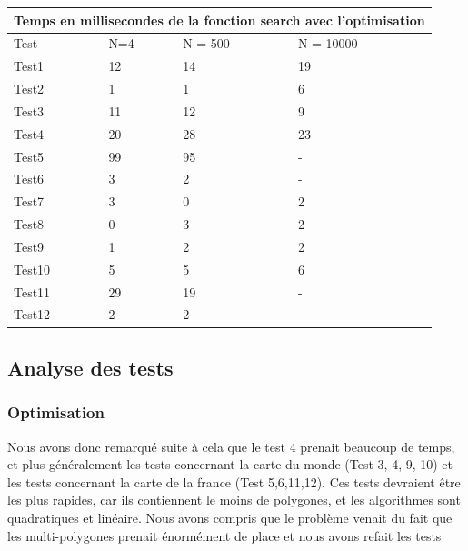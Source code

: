 \documentclass[utf8]{article}
\begin{document}
\begin{large}
  \begin{tabular}{ |p{3cm}||p{3cm}|p{3cm}|p{3cm}|  }
    \hline
    \multicolumn{4}{|c|}{Temps en millisecondes de la fonction search avec l'optimisation} \\
    \hline
    Test   & N=4 & N = 500 & N = 10000                                                     \\
    \hline
    Test1  & 12  & 14      & 19                                                            \\
    Test2  & 1   & 1       & 6                                                             \\
    Test3  & 11  & 12      & 9                                                             \\
    Test4  & 20  & 28      & 23                                                            \\
    Test5  & 99  & 95      & -                                                             \\
    Test6  & 3   & 2       & -                                                             \\
    Test7  & 3   & 0       & 2                                                             \\
    Test8  & 0   & 3       & 2                                                             \\
    Test9  & 1   & 2       & 2                                                             \\
    Test10 & 5   & 5       & 6                                                             \\
    Test11 & 29  & 19      & -                                                             \\
    Test12 & 2   & 2       & -                                                             \\
    \hline
  \end{tabular}



  \subsection{Analyse des tests}\label{Analyse des tests}
  \subsubsection{Optimisation}
  \par
  \indent
  Nous avons donc remarqué suite à cela que le test 4 prenait beaucoup de temps,
  et plus généralement les tests concernant la carte du monde (Test 3, 4, 9, 10)
  et les tests concernant la carte de la france (Test 5,6,11,12). Ces tests
  devraient être les plus rapides, car ils contiennent le moins de polygones, et
  les algorithmes sont quadratiques et linéaire. Nous avons compris que le
  problème venait du fait que les multi-polygones prenait énormément de place et nous avons refait les tests

\end{large}
\end{document}
